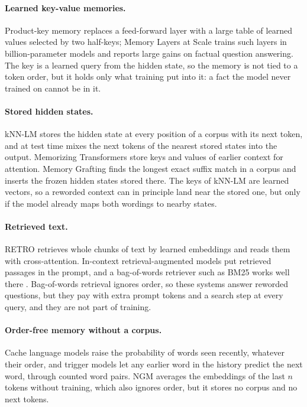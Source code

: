 \documentclass[11pt]{article}
\begin{document}
\paragraph{Learned key-value memories.} Product-key memory \cite{pkm} replaces a feed-forward layer with a large table of learned values selected by two half-keys; Memory Layers at Scale \cite{memlayers} trains such layers in billion-parameter models and reports large gains on factual question answering. The key is a learned query from the hidden state, so the memory is not tied to a token order, but it holds only what training put into it: a fact the model never trained on cannot be in it.

\paragraph{Stored hidden states.} kNN-LM \cite{knnlm} stores the hidden state at every position of a corpus with its next token, and at test time mixes the next tokens of the nearest stored states into the output. Memorizing Transformers \cite{memtrans} store keys and values of earlier context for attention. Memory Grafting \cite{grafting} finds the longest exact suffix match in a corpus and inserts the frozen hidden states stored there. The keys of kNN-LM are learned vectors, so a reworded context can in principle land near the stored one, but only if the model already maps both wordings to nearby states.

\paragraph{Retrieved text.} RETRO \cite{retro} retrieves whole chunks of text by learned embeddings and reads them with cross-attention. In-context retrieval-augmented models put retrieved passages in the prompt, and a bag-of-words retriever such as BM25 works well there \cite{icralm}. Bag-of-words retrieval ignores order, so these systems answer reworded questions, but they pay with extra prompt tokens and a search step at every query, and they are not part of training.

\paragraph{Order-free memory without a corpus.} Cache language models \cite{cache} raise the probability of words seen recently, whatever their order, and trigger models \cite{trigger} let any earlier word in the history predict the next word, through counted word pairs. NGM \cite{ngm} averages the embeddings of the last $n$ tokens without training, which also ignores order, but it stores no corpus and no next tokens.
\end{document}
